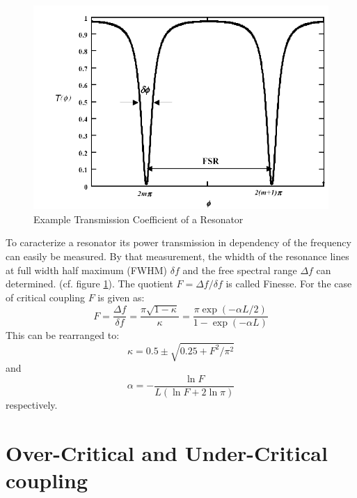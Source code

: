 \begin{figure}[h]%
\centering
\includegraphics[width=.5\columnwidth]{Grafiken/S21.pdf}%
\caption{Example Transmission Coefficient of a Resonator}%
\label{fig:S21}%
\end{figure}

To caracterize a resonator its power transmission in dependency of the frequency can easily be measured. By that measurement, the whidth of the resonance lines at full width half maximum (FWHM) $\delta f$ and the free spectral range $\Delta f$ can determined. (cf. figure \ref{fig:S21}). The quotient $F= \Delta f/\delta f$ is called Finesse. For the case of critical coupling $F$ is given as:
\begin{equation}
 F = \frac{\Delta f}{\delta f} = \frac{\pi\sqrt{1-\kappa}}{\kappa}=\frac{\pi\exp\left(-\alpha L/2\right)}{1-\exp\left(-\alpha L\right)}
\end{equation}
This can be rearranged to:
\begin{equation}
 \kappa = 0.5 \pm \sqrt{0.25+F^2/\pi^2}
\end{equation}
and
\begin{equation}
\alpha = -\frac{\ln F}{L(\ln F+2\ln\pi)} 
\end{equation}
respectively.

\section{Over-Critical and Under-Critical coupling}

